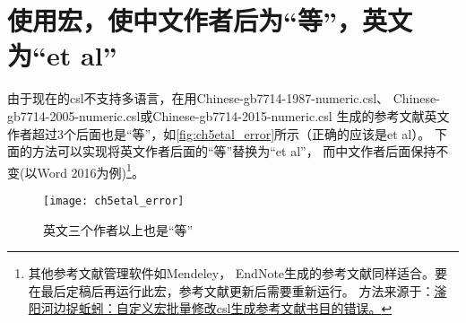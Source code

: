 \documentclass[cn,11pt,chinese]{elegantbook}
\begin{document}
	\section{使用宏，使中文作者后为“等”，英文为“et al”}\label{sec:etal}
			由于现在的csl不支持多语言，在用Chinese-gb7714-1987-numeric.csl、
			Chinese-gb7714-2005-numeric.csl或Chinese-gb7714-2015-numeric.csl
			生成的参考文献英文作者超过3个后面也是“等”，如\autoref{fig:ch5etal_error}所示（正确的应该是et al）。
			下面的方法可以实现将英文作者后面的“等”替换为“et al”，
			而中文作者后面保持不变(以Word 2016为例)\footnote{其他参考文献管理软件如Mendeley，
			EndNote生成的参考文献同样适合。要在最后定稿后再运行此宏，参考文献更新后需要重新运行。
			方法来源于：\href{https://zhuanlan.zhihu.com/p/53594081}
			{滏阳河边捉蚯蚓：自定义宏批量修改csl生成参考文献书目的错误。}}。
			\begin{figure}[htbp]
				\centering
				\texttt{[image: ch5etal\_error]}
				\caption{英文三个作者以上也是“等”}
				\label{fig:ch5etal_error}
			\end{figure}
		
\end{document}
